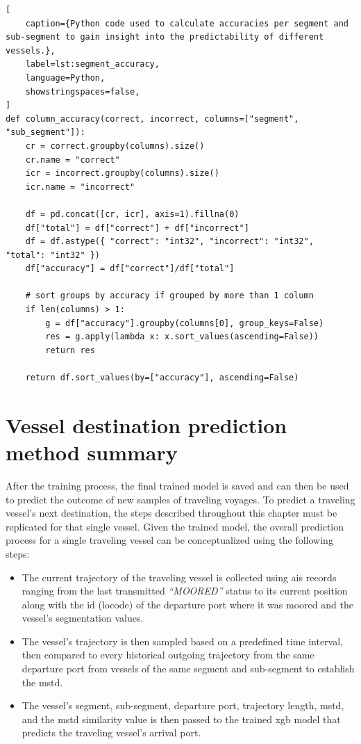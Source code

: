 \begin{lstlisting}[
    caption={Python code used to calculate accuracies per segment and sub-segment to gain insight into the predictability of different vessels.},
    label=lst:segment_accuracy,
    language=Python,
    showstringspaces=false,
]
def column_accuracy(correct, incorrect, columns=["segment", "sub_segment"]):
    cr = correct.groupby(columns).size()
    cr.name = "correct"
    icr = incorrect.groupby(columns).size()
    icr.name = "incorrect"

    df = pd.concat([cr, icr], axis=1).fillna(0)
    df["total"] = df["correct"] + df["incorrect"]
    df = df.astype({ "correct": "int32", "incorrect": "int32", "total": "int32" })
    df["accuracy"] = df["correct"]/df["total"]

    # sort groups by accuracy if grouped by more than 1 column
    if len(columns) > 1:
        g = df["accuracy"].groupby(columns[0], group_keys=False)
        res = g.apply(lambda x: x.sort_values(ascending=False))
        return res

    return df.sort_values(by=["accuracy"], ascending=False)
\end{lstlisting}

\section{Vessel destination prediction method summary}
\label{sec:pred_summary}

After the training process, the final trained model is saved and can then be used to predict the outcome of new samples of traveling voyages. To predict a traveling vessel's next destination, the steps described throughout this chapter must be replicated for that single vessel. Given the trained model, the overall prediction process for a single traveling vessel can be conceptualized using the following steps:

\begin{itemize}
    \item The current trajectory of the traveling vessel is collected using \acrshort{ais} records ranging from the last transmitted \textit{``MOORED''} status to its current position along with the id (\gls{locode}) of the departure port where it was moored and the vessel's segmentation values.
    \item The vessel's trajectory is then sampled based on a predefined time interval, then compared to every historical outgoing trajectory from the same departure port from vessels of the same segment and sub-segment to establish the \acrfull{mstd}.
    \item The vessel's segment, sub-segment, departure port, trajectory length, \acrshort{mstd}, and the \acrshort{mstd} similarity value is then passed to the trained \acrshort{xgb} model that predicts the traveling vessel's arrival port.
\end{itemize}
